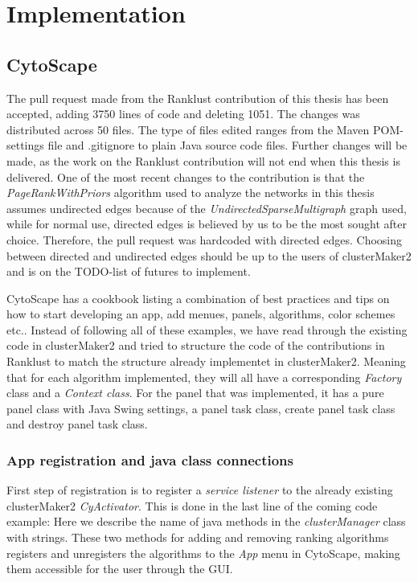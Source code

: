 \part{Implementation}
\label{pa:implementation}
\chapter{CytoScape}
The pull request\cite{git-pull-request} made from the Ranklust
contribution of this thesis has been accepted\cite{ranklust-accepted}, adding
3750 lines of code and deleting 1051. The changes was distributed across 50
files. The type of files edited ranges from the Maven POM-settings file and
.gitignore to plain Java source code files. Further changes will be made, as the
work on the Ranklust contribution will not end when this thesis is delivered.
One of the most recent changes to the contribution is that the
\textit{PageRankWithPriors} algorithm used to analyze the networks in this
thesis assumes undirected edges because of the
\textit{UndirectedSparseMultigraph} graph used, while for normal use, directed
edges is believed by us to be the most sought after choice. Therefore, the pull
request was hardcoded with directed edges. Choosing between directed and
undirected edges should be up to the users of clusterMaker2 and is on the
TODO-list of futures to implement.

CytoScape has a cookbook\cite{cytoscape-cookbook} listing a combination of best
practices and tips on how to start developing an app, add menues, panels,
algorithms, color schemes etc.. Instead of following all of these examples, we
have read through the existing code in clusterMaker2\cite{cm2-github} and tried
to structure the code of the contributions in Ranklust to match the structure
already implementet in clusterMaker2. Meaning that for each algorithm
implemented, they will all have a corresponding \textit{Factory} class and a
\textit{Context class}. For the panel that was implemented, it has a pure panel
class with Java Swing\cite{java-swing} settings, a panel task class, create
panel task class and destroy panel task class. %

\section{App registration and java class connections}
First step of registration is to register a \textit{service listener} to the
already existing clusterMaker2 \textit{CyActivator}. This is done in the last
line of the coming code example: Here we describe the name of java methods in
the \textit{clusterManager} class with strings. These two methods for adding and
removing ranking algorithms registers and unregisters the algorithms to the
\textit{App} menu in CytoScape, making them accessible for the user through the
GUI.

